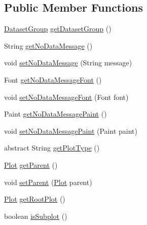 \subsection*{Public Member Functions}
\begin{DoxyCompactItemize}
\item 
\mbox{\hyperlink{classorg_1_1jfree_1_1data_1_1general_1_1_dataset_group}{Dataset\+Group}} \mbox{\hyperlink{classorg_1_1jfree_1_1chart_1_1plot_1_1_plot_ad2dfcb9fbeb29710b376aa4f9fb3888e}{get\+Dataset\+Group}} ()
\item 
String \mbox{\hyperlink{classorg_1_1jfree_1_1chart_1_1plot_1_1_plot_a6a121d914481157af8e29f372ff130eb}{get\+No\+Data\+Message}} ()
\item 
void \mbox{\hyperlink{classorg_1_1jfree_1_1chart_1_1plot_1_1_plot_aee0433130592a26f29833dd91a3bc7a1}{set\+No\+Data\+Message}} (String message)
\item 
Font \mbox{\hyperlink{classorg_1_1jfree_1_1chart_1_1plot_1_1_plot_a6134fc2403602286e07e6773f963c6f6}{get\+No\+Data\+Message\+Font}} ()
\item 
void \mbox{\hyperlink{classorg_1_1jfree_1_1chart_1_1plot_1_1_plot_ac65a69bf34be07947529f145f8ede35e}{set\+No\+Data\+Message\+Font}} (Font font)
\item 
Paint \mbox{\hyperlink{classorg_1_1jfree_1_1chart_1_1plot_1_1_plot_a0fc5a1f4190e5a464857145a7ad15286}{get\+No\+Data\+Message\+Paint}} ()
\item 
void \mbox{\hyperlink{classorg_1_1jfree_1_1chart_1_1plot_1_1_plot_a5c60638325f40e3bc67520ef612872d9}{set\+No\+Data\+Message\+Paint}} (Paint paint)
\item 
abstract String \mbox{\hyperlink{classorg_1_1jfree_1_1chart_1_1plot_1_1_plot_a1bbedf6241695cf9ecfc3fe08f9f05b6}{get\+Plot\+Type}} ()
\item 
\mbox{\hyperlink{classorg_1_1jfree_1_1chart_1_1plot_1_1_plot}{Plot}} \mbox{\hyperlink{classorg_1_1jfree_1_1chart_1_1plot_1_1_plot_a7dd8b47d0a7ec2a24291ee9e29c9a9ba}{get\+Parent}} ()
\item 
void \mbox{\hyperlink{classorg_1_1jfree_1_1chart_1_1plot_1_1_plot_afdbfc2dc3e4eafa1fb53b699bc8e088d}{set\+Parent}} (\mbox{\hyperlink{classorg_1_1jfree_1_1chart_1_1plot_1_1_plot}{Plot}} parent)
\item 
\mbox{\hyperlink{classorg_1_1jfree_1_1chart_1_1plot_1_1_plot}{Plot}} \mbox{\hyperlink{classorg_1_1jfree_1_1chart_1_1plot_1_1_plot_ace0910e2ba9df3867dd6992163012ba3}{get\+Root\+Plot}} ()
\item 
boolean \mbox{\hyperlink{classorg_1_1jfree_1_1chart_1_1plot_1_1_plot_aabc12756f8fc3f63605ca3eb8893fd19}{is\+Subplot}} ()

\end{DoxyCompactItemize}
